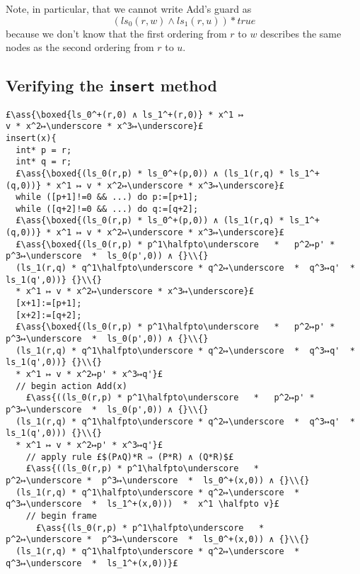 \documentclass[12pt,a4paper]{article}
\makeatletter
\newcommand{\ml}[2][t]{\mbox{\mdseries\begin{tabular}[#1]{@{}L@{}}#2\end{tabular}}}
\newcommand{\ass}[1]{\ensuremath{{\color{blue}\left\{\ml[c]{#1}\right\}}}}
\makeatother
\begin{document}
\noindent Note, in particular, that we cannot write {\sc Add}'s guard as 
\[
\boxed{(ls_0(r,w) ∧ ls_1(r,u)) * true}
\]
because we don't know that the first ordering from $r$ to $w$ describes the same nodes as the second ordering from $r$ to $u$.

\subsection{Verifying the {\tt insert} method}

\begin{lstlisting}
£\ass{\boxed{ls_0^+(r,0) ∧ ls_1^+(r,0)} * x^1 ↦ v * x^2↦\underscore * x^3↦\underscore}£
insert(x){
  int* p = r;
  int* q = r;
  £\ass{\boxed{(ls_0(r,p) * ls_0^+(p,0)) ∧ (ls_1(r,q) * ls_1^+(q,0))} * x^1 ↦ v * x^2↦\underscore * x^3↦\underscore}£
  while ([p+1]!=0 && ...) do p:=[p+1];
  while ([q+2]!=0 && ...) do q:=[q+2];
  £\ass{\boxed{(ls_0(r,p) * ls_0^+(p,0)) ∧ (ls_1(r,q) * ls_1^+(q,0))} * x^1 ↦ v * x^2↦\underscore * x^3↦\underscore}£
  £\ass{\boxed{(ls_0(r,p) * p^1\halfpto\underscore   *   p^2↦p' *  p^3↦\underscore  *  ls_0(p',0)) ∧ {}\\{}
  (ls_1(r,q) * q^1\halfpto\underscore * q^2↦\underscore  *  q^3↦q'  *  ls_1(q',0))} {}\\{} 
  * x^1 ↦ v * x^2↦\underscore * x^3↦\underscore}£
  [x+1]:=[p+1];
  [x+2]:=[q+2];
  £\ass{\boxed{(ls_0(r,p) * p^1\halfpto\underscore   *   p^2↦p' *  p^3↦\underscore  *  ls_0(p',0)) ∧ {}\\{}
  (ls_1(r,q) * q^1\halfpto\underscore * q^2↦\underscore  *  q^3↦q'  *  ls_1(q',0))} {}\\{}
  * x^1 ↦ v * x^2↦p' * x^3↦q'}£
  // begin action Add(x)
    £\ass{((ls_0(r,p) * p^1\halfpto\underscore   *   p^2↦p' *  p^3↦\underscore  *  ls_0(p',0)) ∧ {}\\{}
  (ls_1(r,q) * q^1\halfpto\underscore * q^2↦\underscore  *  q^3↦q'  *  ls_1(q',0))) {}\\{}
  * x^1 ↦ v * x^2↦p' * x^3↦q'}£
    // apply rule £$(P∧Q)*R ⇒ (P*R) ∧ (Q*R)$£ 
    £\ass{((ls_0(r,p) * p^1\halfpto\underscore   *   p^2↦\underscore *  p^3↦\underscore  *  ls_0^+(x,0)) ∧ {}\\{}
  (ls_1(r,q) * q^1\halfpto\underscore * q^2↦\underscore  *  q^3↦\underscore  *  ls_1^+(x,0)))  *  x^1 \halfpto v}£
    // begin frame
      £\ass{(ls_0(r,p) * p^1\halfpto\underscore   *   p^2↦\underscore *  p^3↦\underscore  *  ls_0^+(x,0)) ∧ {}\\{}
  (ls_1(r,q) * q^1\halfpto\underscore * q^2↦\underscore  *  q^3↦\underscore  *  ls_1^+(x,0))}£

\end{lstlisting}
\end{document}
